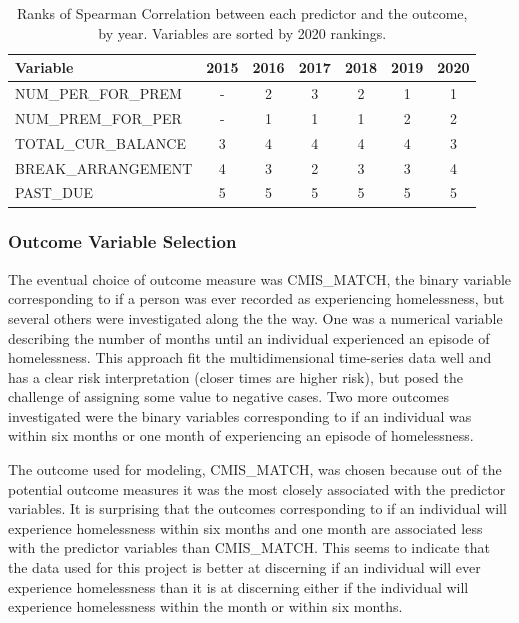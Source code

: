 \documentclass[10pt,letterpaper]{article}
\begin{document}
\begin{table}[!h]
    \centering
    \begin{tabular}{lcccccc}
        \toprule
                 Variable &  2015 &  2016 &  2017 &  2018 &  2019 &  2020 \\
        \midrule
        NUM\_PER\_FOR\_PREM &     - &     2 &     3 &     2 &     1 &     1 \\
        NUM\_PREM\_FOR\_PER &     - &     1 &     1 &     1 &     2 &     2 \\
        TOTAL\_CUR\_BALANCE &     3 &     4 &     4 &     4 &     4 &     3 \\
        BREAK\_ARRANGEMENT  &     4 &     3 &     2 &     3 &     3 &     4 \\
        PAST\_DUE           &     5 &     5 &     5 &     5 &     5 &     5 \\
        \bottomrule
    \end{tabular}
\caption{Ranks of Spearman Correlation between each predictor and the outcome, by year. Variables are sorted by 2020 rankings.}
\label{tbl:corr_years}
\end{table}

\subsubsection*{Outcome Variable Selection}
The eventual choice of outcome measure was CMIS\_MATCH, the binary variable corresponding to if a person was ever recorded as experiencing homelessness, but several others were investigated along the the way. One was a numerical variable describing the number of months until an individual experienced an episode of homelessness. This approach fit the multidimensional time-series data well and has a clear risk interpretation (closer times are higher risk), but posed the challenge of assigning some value to negative cases. Two more outcomes investigated were the binary variables corresponding to if an individual was within six months or one month of experiencing an episode of homelessness.

The outcome used for modeling, CMIS\_MATCH, was chosen because out of the potential outcome measures it was the most closely associated with the predictor variables. It is surprising that the outcomes corresponding to if an individual will experience homelessness within six months and one month are associated less with the predictor variables than CMIS\_MATCH. This seems to indicate that the data used for this project is better at discerning if an individual will ever experience homelessness than it is at discerning either if the individual will experience homelessness within the month or within six months.
\end{document}
